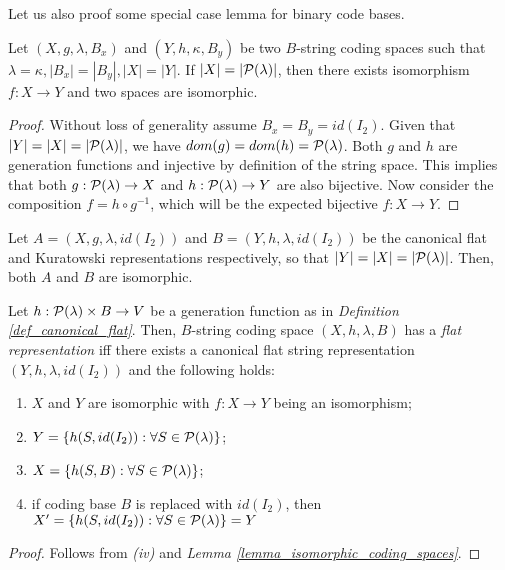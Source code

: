 Let us also proof some special case lemma for binary code bases.

\begin{lemma}\label{lemma_isomorphic_coding_spaces}
    Let $(X, g, \lambda, B_x)$ and $(Y, h, \kappa, B_y)$ be two $B$-string coding spaces such that $\lambda = \kappa, |B_x| = |B_y|, |X| = |Y|$. If $|X| = |\mathcal{P}(\lambda)|$, then there exists isomorphism $f: X \to Y$ and two spaces are isomorphic.
\end{lemma}
\begin{proof}
    Without loss of generality assume $B_x = B_y = id(I_2)$. Given that $|Y| = |X| = |\mathcal{P}(\lambda)|$, we have $dom(g) = dom(h) = \mathcal{P}(\lambda)$. Both $g$ and $h$ are generation functions and injective by definition of the string space. This implies that both $g: \mathcal{P}(\lambda) \to X$ and $h: \mathcal{P}(\lambda) \to Y$ are also bijective. Now consider the composition $f = h \circ  g^{-1}$, which will be the expected bijective $f: X \to Y$.
\end{proof}

\begin{corollary}
    Let $A = (X, g, \lambda, id(I_2))$ and $B = (Y, h, \lambda, id(I_2))$ be the canonical flat and Kuratowski representations respectively, so that $|Y| = |X| = |\mathcal{P}(\lambda)|$. Then, both $A$ and $B$ are isomorphic.
\end{corollary}

\begin{lemma}\label{lemma_flat_representation}
    Let $h: \mathcal{P}(\lambda) \times B \to V$ be a generation function as in \textit{Definition \ref{def_canonical_flat}}.
    Then, $B$-string coding space $(X, h, \lambda, B)$ has a \textit{flat representation} iff there exists a canonical flat string representation $(Y, h, \lambda, id(I_2))$ and the following holds: 
    \begin{enumerate}[label=(\roman*)]
        \item $X$ and $Y$ are isomorphic with $f: X \to Y$ being an isomorphism;
        \item $Y = \{ h(S, id(I_2)): \forall S \in \mathcal{P}(\lambda)\}$;
        \item $X = \{ h(S, B): \forall S \in \mathcal{P}(\lambda)\}$;
        \item if coding base $B$ is replaced with $id(I_2)$, then $X^\prime = \{ h(S, id(I_2)): \forall S \in \mathcal{P}(\lambda)\} = Y$
    \end{enumerate}
\end{lemma}
\begin{proof}
    Follows from \textit{(iv)} and \textit{Lemma \ref{lemma_isomorphic_coding_spaces}}.
\end{proof}

